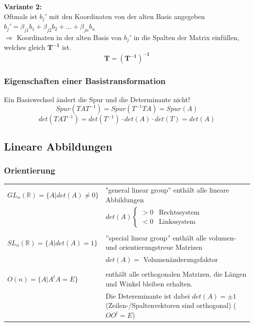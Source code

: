 		\textbf{Variante 2:}\\
		Oftmals ist $b_j'$ mit den Koordinaten von der alten Basis angegeben\\
		$b_j' = \beta_{j1}b_1 + \beta_{j2}b_2 + \ldots + \beta_{jn}b_n$\\
		$\Rightarrow$ Koordinaten in der alten Basis von $b_j'$ in die Spalten der Matrix einfüllen, welches gleich $\mathbf{T^{-1}}$ ist.\\
		\begin{equation*}
			\mathbf{T = (T^{-1})^{-1}}
		\end{equation*}

	\subsubsection{Eigenschaften einer Basistransformation}
		Ein Basiswechsel ändert die Spur und die Determinante nicht!\\
		\begin{equation*}
			Spur(TAT^{-1}) = Spur(T^{-1}TA) = Spur(A)
		\end{equation*}
		\begin{equation*}
			det(TAT^{-1}) = det(T^{-1}) \cdot det(A) \cdot det(T) = det(A)
		\end{equation*}

\subsection{Lineare Abbildungen}
	\subsubsection{Orientierung}
		\begin{tabular}{lp{13cm}}
			$GL_n(\mathbb{R}) = \lbrace A | det(A) \neq 0\rbrace$ & "general linear group'' enthält alle lineare Abbildungen\\
			& $det(A)\left\lbrace\begin{array}{cc}
				>0 & \text{Rechtssystem}\\
				<0 & \text{Linkssystem}
				\end{array}\right.$ \\ \\

			$SL_n(\mathbb{R}) = \lbrace A | det(A) = 1 \rbrace$ &  ''special linear group'' enthält alle volumen- und orientierungstreue Matrizen\\
			& $det(A) =$ Volumenänderungsfaktor \\ \\

			$O(n) = \lbrace A | A^tA = E \rbrace$ & enthält alle orthogonalen Matrizen, die Längen und Winkel bleiben erhalten.\\
			& Die Detereminante ist dabei $det(A) = \pm1$ (Zeilen-/Spaltenvektoren sind orthogonal) ($OO^t = E$)
		\end{tabular}\\ \\

